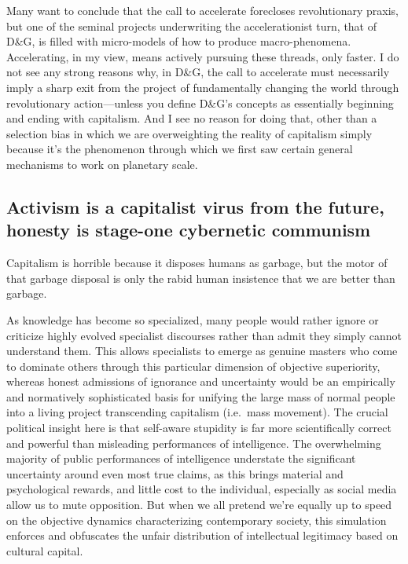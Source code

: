 \documentclass[a4paper,12pt,margin=.5in]{article}
\begin{document}
Many want to conclude that the call to accelerate forecloses
revolutionary praxis, but one of the seminal projects underwriting the
accelerationist turn, that of D\&G, is filled with micro-models of how
to produce macro-phenomena. Accelerating, in my view, means actively
pursuing these threads, only faster. I do not see any strong reasons
why, in D\&G, the call to accelerate must necessarily imply a sharp exit
from the project of fundamentally changing the world through
revolutionary action---unless you define D\&G's concepts as essentially
beginning and ending with capitalism. And I see no reason for doing
that, other than a selection bias in which we are overweighting the
reality of capitalism simply because it's the phenomenon through which
we first saw certain general mechanisms to work on planetary scale.

\subsection{Activism is a capitalist virus from the future, honesty is
stage-one cybernetic
communism}\label{activism-is-a-capitalist-virus-from-the-future-honesty-is-stage-one-cybernetic-communism}

Capitalism is horrible because it disposes humans as garbage, but the
motor of that garbage disposal is only the rabid human insistence that
we are better than garbage.

As knowledge has become so specialized, many people would rather ignore
or criticize highly evolved specialist discourses rather than admit they
simply cannot understand them. This allows specialists to emerge as
genuine masters who come to dominate others through this particular
dimension of objective superiority, whereas honest admissions of
ignorance and uncertainty would be an empirically and normatively
sophisticated basis for unifying the large mass of normal people into a
living project transcending capitalism (i.e.~mass movement). The crucial
political insight here is that self-aware stupidity is far more
scientifically correct and powerful than misleading performances of
intelligence. The overwhelming majority of public performances of
intelligence understate the significant uncertainty around even most
true claims, as this brings material and psychological rewards, and
little cost to the individual, especially as social media allow us to
mute opposition. But when we all pretend we're equally up to speed on
the objective dynamics characterizing contemporary society, this
simulation enforces and obfuscates the unfair distribution of
intellectual legitimacy based on cultural capital.
\end{document}

